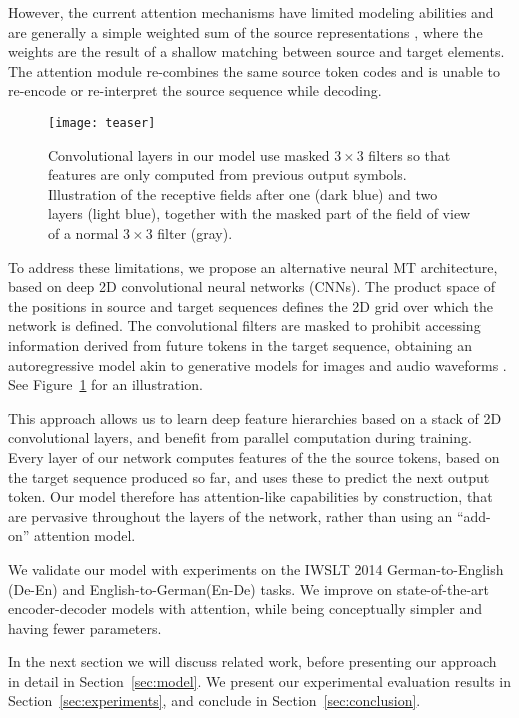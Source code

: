 \documentclass[11pt,a4paper]{article}
\def\fig#1{Figure~\ref{fig:#1}}
\def\sect#1{Section~\ref{sec:#1}}
\begin{document}
However, the current attention mechanisms have limited modeling abilities and are generally a simple weighted sum of the source representations \cite{ bahdanau15iclr, luong15emnlp}, where the weights are the result of a shallow matching between source and target elements. The attention module re-combines the same source token codes and is unable to re-encode or re-interpret the source sequence while decoding.
\begin{figure}
\begin{center}
\texttt{[image: teaser]}
\end{center}
\caption{Convolutional layers in our model use masked $3\!\times\!3$ filters so that features are only computed from previous output symbols. 
Illustration of the receptive fields after one (dark blue) and two layers (light blue), together with the masked part of the field of view of a normal $3\!\times\!3$ filter (gray).}
\label{fig:teaser}
\end{figure}

To address these limitations, we propose an alternative neural MT architecture, based on deep 2D convolutional neural networks (CNNs). 
The product space of the positions in source and target sequences defines the 2D grid over which the network is defined. 
The convolutional filters are masked to prohibit accessing information derived from future tokens in the target sequence, obtaining an autoregressive model akin to generative models for images and audio waveforms \cite{oord16ssw,oord16icml}.
See \fig{teaser} for an illustration.

This approach allows us to learn deep feature hierarchies based on a stack of 2D convolutional layers, and benefit from parallel computation during training.
Every layer of our network computes features of the the source tokens, based on the target sequence produced so far, and uses these to predict the next output token. 
Our model therefore has attention-like capabilities by construction, that are pervasive throughout the layers of the network, rather than using an ``add-on'' attention model.

We validate our model with experiments on the IWSLT 2014 German-to-English (De-En) and English-to-German(En-De) tasks.
We improve on state-of-the-art encoder-decoder models with attention, while being conceptually simpler and having fewer parameters.

In the next section we will discuss related work, before presenting our approach in detail in \sect{model}.
We present our experimental evaluation results in \sect{experiments}, and conclude in \sect{conclusion}. 
\end{document}
